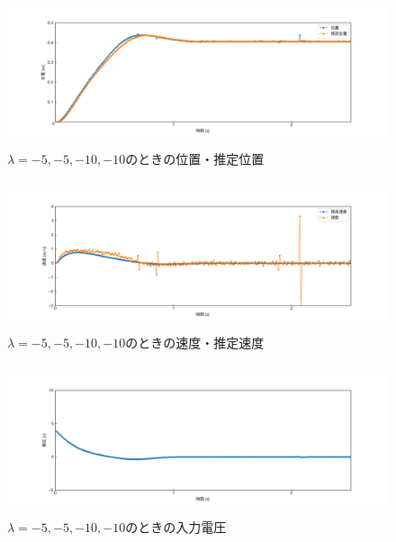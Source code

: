 \documentclass[12pt]{jsarticle}
\begin{document}
\begin{figure}[H]
  \begin{center}
    \includegraphics[clip,width=13.0cm, height=4.4cm]{../img/Exp11-1.png}
    \caption{$\lambda=-5, -5, -10, -10$のときの位置・推定位置}
    \label{Exp11-1}
  \end{center}
\end{figure}
\begin{figure}[H]
  \begin{center}
    \includegraphics[clip,width=13.0cm, height=4.4cm]{../img/Exp11-2.png}
    \caption{$\lambda=-5, -5, -10, -10$のときの速度・推定速度}
    \label{Exp11-2}
  \end{center}
\end{figure}
\begin{figure}[H]
  \begin{center}
    \includegraphics[clip,width=13.0cm, height=4.4cm]{../img/Exp11-3.png}
    \caption{$\lambda=-5, -5, -10, -10$のときの入力電圧}
    \label{Exp11-3}
  \end{center}
\end{figure}
\end{document}
